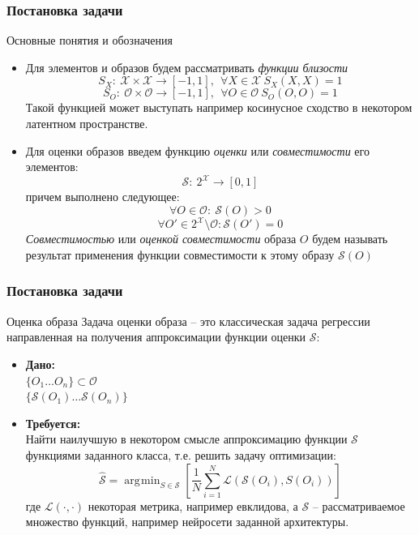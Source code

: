 \documentclass[10pt]{beamer}
\DeclareMathOperator*{\argmin}{\arg\!\min}
\begin{document}
\begin{frame}
	\frametitle{Постановка задачи}
	\begin{block}{Основные понятия и обозначения}
		\begin{itemize}
			\item Для элементов и образов будем рассматривать \textit{функции близости}
			$$S_X:~\mathcal{X}\times \mathcal{X}\longrightarrow [-1,1], ~~\forall X\in\mathcal{X}~S_X(X,X) = 1$$
			$$S_O:~\mathcal{O}\times \mathcal{O}\longrightarrow [-1,1], ~~\forall O\in\mathcal{O}~S_O(O,O) = 1$$
			Такой функцией может выступать например косинусное сходство в некотором латентном пространстве.
			
			\item Для оценки образов введем функцию \textit{оценки} или \textit{совместимости} его элементов: 
			$$\mathcal{S}:~2^\mathcal{X}\longrightarrow [0,1]$$
			причем выполнено следующее:
			$$\forall O \in \mathcal{O}:~\mathcal{S}(O) > 0$$
			$$\forall O' \in 2^\mathcal{X} \setminus \mathcal{O}: \mathcal{S}(O') =0$$
			\textit{Совместимостью} или \textit{оценкой совместимости} образа $O$ будем называть результат применения функции совместимости к этому образу $\mathcal{S}(O)$
		\end{itemize}
	\end{block}					
\end{frame}


\begin{frame}
	\frametitle{Постановка задачи}
	\begin{block}{Оценка образа}
		Задача оценки образа -- это классическая задача регрессии направленная на получения аппроксимации функции оценки $ \mathcal{S}$: \\
		\begin{itemize}
			\item \textbf{Дано:}\\
			$\{O_1\dots O_n\}\subset \mathcal{O}$\\
			$\{\mathcal{S}(O_1)\dots\mathcal{S}(O_n)\}$
			\item \textbf{Требуется:}\\
			Найти наилучшую в некотором смысле аппроксимацию функции $\mathcal{S}$ функциями заданного класса, т.е. решить задачу оптимизации:\\
			$$\hat{\mathcal{S}}= \argmin_{S\in\mathscr{S}}\left[\frac{1}{N} \sum\limits_{i=1}^N\mathcal{L}(\mathcal{S}(O_i), S(O_i))\right]$$
			где $\mathcal{L}(\cdot, \cdot)$ некоторая метрика, например евклидова, а $\mathscr{S}$ -- рассматриваемое множество функций, например нейросети заданной архитектуры.
		\end{itemize}
\end{block}					
\end{frame}
\end{document}

